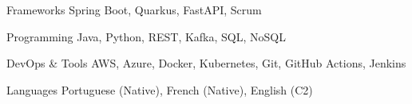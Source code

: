 

\begin{cvskills}

  \cvskill
    {Frameworks} %
    {Spring Boot, Quarkus, FastAPI, Scrum} %

  \cvskill
    {Programming} %
    {Java, Python, REST, Kafka, SQL, NoSQL} %

  \cvskill
    {DevOps \& Tools} %
    {AWS, Azure, Docker, Kubernetes, Git, GitHub Actions, Jenkins} %

  \cvskill
    {Languages} %
    {Portuguese (Native), French (Native), English (C2)} %

\end{cvskills}
